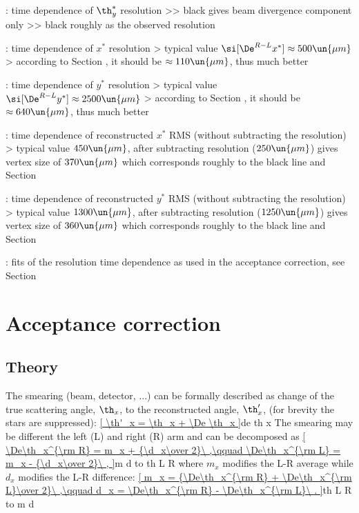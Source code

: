 \> : time dependence of $\th^*_y$ resolution
\>>> black gives beam divergence component only
\>>> black roughly as the observed resolution

\> : time dependence of $x^*$ resolution
\>> typical value $\si[\De^{R-L} x^*] \approx 500\un{\mu m}$
\>> according to Section , it should be $\approx 110\un{\mu m}$, thus much better

\> : time dependence of $y^*$ resolution
\>> typical value $\si[\De^{R-L} y^*] \approx 2500\un{\mu m}$
\>> according to Section , it should be $\approx 640\un{\mu m}$, thus much better

\> : time dependence of reconstructed $x^*$ RMS (without subtracting the resolution)
\>> typical value $450\un{\mu m}$, after subtracting resolution ($250\un{\mu m}$) gives vertex size of $370\un{\mu m}$ which corresponds roughly to the black line and Section 

\> : time dependence of reconstructed $y^*$ RMS (without subtracting the resolution)
\>> typical value $1300\un{\mu m}$, after subtracting resolution ($1250\un{\mu m}$) gives vertex size of $360\un{\mu m}$ which corresponds roughly to the black line and Section 

\> : fits of the resolution time dependence as used in the acceptance correction, see Section 



\chapter[acc-corr]{Acceptance correction}

\section{Theory}

\vskip3mm

The smearing (beam, detector, ...) can be formally described as change of the true scattering angle, $\th_x$, to the reconstructed angle, $\th'_x$, (for brevity the stars are suppressed):
\eqref{
\th'_x = \th_x + \De \th_x
}{de th x}
The smearing may be different the left (L) and right (R) arm and can be decomposed as
\eqref{
\De\th_x^{\rm R} = m_x + {\d_x\over 2}\ ,\qquad \De\th_x^{\rm L} = m_x - {\d_x\over 2}\ ,
}{m d to th L R}
where $m_x$ modifies the L-R average while $d_x$ modifies the L-R difference:
\eqref{
m_x = {\De\th_x^{\rm R} + \De\th_x^{\rm L}\over 2}\ ,\qquad d_x = \De\th_x^{\rm R} - \De\th_x^{\rm L}\ .
}{th L R to m d}

